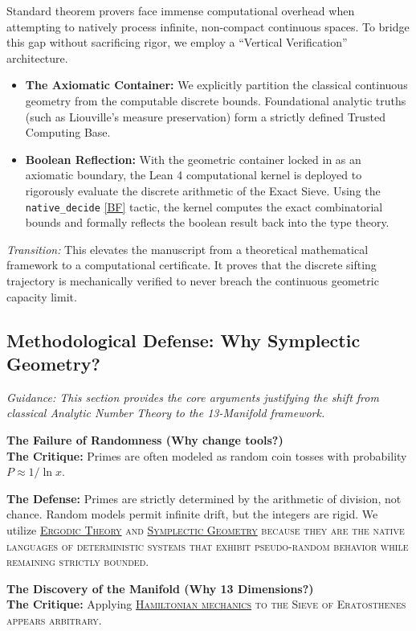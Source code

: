 \documentclass[sn-mathphys-num, pdflatex, referee]{sn-jnl}
\newcommand{\gterm}[2]{\begingroup\normalfont\scshape\hyperlink{#1}{#2}\endgroup}
\begin{document}
    Standard theorem provers face immense computational overhead when attempting to natively process infinite, non-compact continuous spaces. To bridge this gap without sacrificing rigor, we employ a ``Vertical Verification'' architecture. 

\begin{itemize}
    \item \textbf{The Axiomatic Container:} We explicitly partition the classical continuous geometry from the computable discrete bounds. Foundational analytic truths (such as Liouville's measure preservation) form a strictly defined Trusted Computing Base. 
    \item \textbf{Boolean Reflection:} With the geometric container locked in as an axiomatic boundary, the Lean 4 computational kernel is deployed to rigorously evaluate the discrete arithmetic of the Exact Sieve. Using the \texttt{native\_decide} \ref{BF} tactic, the kernel computes the exact combinatorial bounds and formally reflects the boolean result back into the type theory. 
\end{itemize}

\textit{Transition:} This elevates the manuscript from a theoretical mathematical framework to a computational certificate. It proves that the discrete sifting trajectory is mechanically verified to never breach the continuous geometric capacity limit.


\subsection{Methodological Defense: Why Symplectic Geometry?}

\textit{Guidance: This section provides the core arguments justifying the shift from classical Analytic Number Theory to the 13-Manifold framework.}

\noindent \textbf{The Failure of Randomness (Why change tools?)} \\
\noindent \textbf{The Critique:} Primes are often modeled as random coin tosses with probability $P \approx 1/\ln x$. 

\textbf{The Defense:} Primes are strictly determined by the arithmetic of division, not chance. Random models permit infinite drift, but the integers are rigid. We utilize \gterm{ergodic}{Ergodic Theory} and \gterm{geometry}{Symplectic Geometry} because they are the native languages of deterministic systems that exhibit pseudo-random behavior while remaining strictly bounded.

\noindent \textbf{The Discovery of the Manifold (Why 13 Dimensions?)} \\
\textbf{The Critique:} Applying \gterm{hamiltonian}{Hamiltonian mechanics} to the Sieve of Eratosthenes appears arbitrary.
\end{document}
